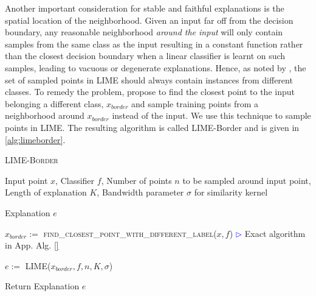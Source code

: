 Another important consideration for stable and faithful explanations is the spatial location of the neighborhood. Given an input far off from the decision boundary, any reasonable neighborhood \textit{around the input} will only contain samples from the same class as the input resulting in a constant function rather than the closest decision boundary when a linear classifier is learnt on such samples, leading to vacuous or degenerate explanations. Hence, as noted by \cite{}, the set of sampled points in LIME should always contain instances from different classes. To remedy the problem, \cite{laugel2018defining} propose to find the closest point to the input belonging a different class, $x_{border}$ and sample training points from a neighborhood around $x_{border}$ instead of the input. We use this technique to sample points in LIME. The resulting algorithm is called LIME-Border and is given in \ref{alg:limeborder}.

\begin{algorithm}[tbh]
\begin{algorithmic}[1]
 \caption{\textsc{LIME-Border} \cite{laugel2018defining}}
   \label{alg:limeborder}
    
     Input point $x$, Classifier $f$, Number of points $n$ to be sampled around input point, Length of explanation $K$, Bandwidth parameter $\sigma$ for similarity kernel

     Explanation $e$
    
    \STATE $x_{border}:=$ \textsc{find\_closest\_point\_with\_different\_label($x, f$)} \hfill \textcolor{blue}{$\rhd$} Exact algorithm in App. Alg. \ref{}

    \STATE $e :=$ \textsc{LIME}($x_{border}, f, n, K, \sigma$)
    
    \STATE Return Explanation $e$
\end{algorithmic}
\end{algorithm}
